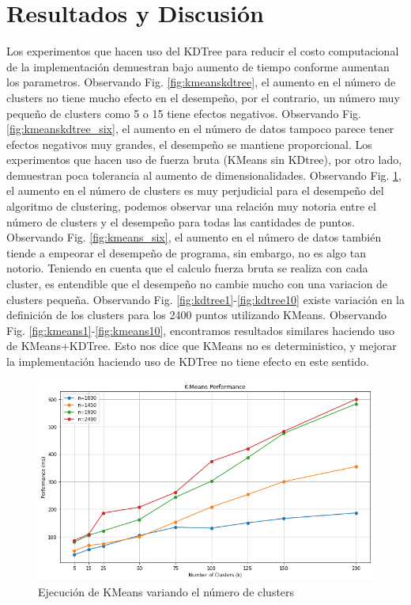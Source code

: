 \documentclass[conference]{IEEEtran}
\begin{document}
\section{Resultados y Discusión}
Los experimentos que hacen uso del KDTree para reducir el costo computacional de la implementación demuestran bajo aumento de tiempo conforme aumentan los parametros. Observando Fig. \ref{fig:kmeanskdtree}, el aumento en el número de clusters no tiene mucho efecto en el desempeño, por el contrario, un número muy pequeño de clusters como 5 o 15 tiene efectos negativos. Observando Fig. \ref{fig:kmeanskdtree_six}, el aumento en el número de datos tampoco parece tener efectos negativos muy grandes, el desempeño se mantiene proporcional.
\newline
Los experimentos que hacen uso de fuerza bruta (KMeans sin KDtree), por otro lado, demuestran poca tolerancia al aumento de dimensionalidades. Observando Fig. \ref{fig:kmeans}, el aumento en el número de clusters es muy perjudicial para el desempeño del algoritmo de clustering, podemos observar una relación muy notoria entre el número de clusters y el desempeño para todas las cantidades de puntos. Observando Fig. \ref{fig:kmeans_six}, el aumento en el número de datos también tiende a empeorar el desempeño de programa, sin embargo, no es algo tan notorio. Teniendo en cuenta que el calculo fuerza bruta se realiza con cada cluster, es entendible que el desempeño no cambie mucho con una variacion de clusters pequeña.
\newline
Observando Fig. \ref{fig:kdtree1}-\ref{fig:kdtree10} existe variación en la definición de los clusters para los 2400 puntos utilizando KMeans. Observando Fig. \ref{fig:kmeans1}-\ref{fig:kmeans10}, encontramos resultados similares haciendo uso de KMeans+KDTree. Esto nos dice que KMeans no es deterministico, y mejorar la implementación haciendo uso de KDTree no tiene efecto en este sentido.
\begin{figure}[htbp]
    \centering
    \includegraphics[width=1\linewidth]{figures/kmeans.png} %
    \caption{Ejecución de KMeans variando el número de clusters}
    \label{fig:kmeans}
\end{figure}
\end{document}
